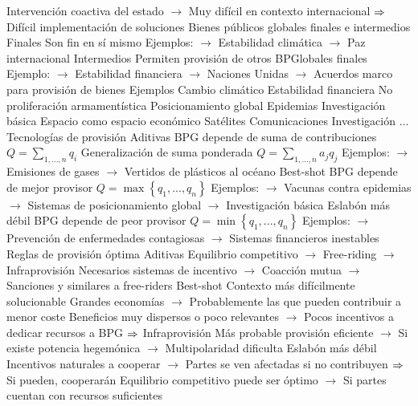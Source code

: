\documentclass{nuevotema}
\begin{document}
\begin{esquemal}
				\4[] Intervención coactiva del estado
				\4[] $\to$ Muy difícil en contexto internacional
				\4[] $\Rightarrow$ Difícil implementación de soluciones
			\3 Bienes públicos globales finales e intermedios
				\4 Finales
				\4[] Son fin en sí mismo
				\4[] Ejemplos:
				\4[] $\to$ Estabilidad climática
				\4[] $\to$ Paz internacional
				\4 Intermedios
				\4[] Permiten provisión de otros BPGlobales finales
				\4[] Ejemplo:
				\4[] $\to$ Estabilidad financiera
				\4[] $\to$ Naciones Unidas
				\4[] $\to$ Acuerdos marco para provisión de bienes
			\3 Ejemplos
				\4 Cambio climático
				\4 Estabilidad financiera
				\4 No proliferación armamentística
				\4 Posicionamiento global
				\4 Epidemias
				\4 Investigación básica
				\4 Espacio como espacio económico
				\4[] Satélites
				\4[] Comunicaciones
				\4[] Investigación
				\4[] ...
			\3 Tecnologías de provisión
				\4 Aditivas
				\4[] BPG depende de suma de contribuciones
				\4[] $Q = \sum_{1,...,n} q_i$
				\4[] Generalización de suma ponderada
				\4[] $Q = \sum_{1,...,n} a_j q_j$
				\4[] Ejemplos:
				\4[] $\to$ Emisiones de gases
				\4[] $\to$ Vertidos de plásticos al océano
				\4 Best-shot
				\4[] BPG depende de mejor provisor
				\4[] $Q = \max \left\lbrace q_1, ..., q_n \right\rbrace$
				\4[] Ejemplos:
				\4[] $\to$ Vacunas contra epidemias
				\4[] $\to$ Sistemas de posicionamiento global
				\4[] $\to$ Investigación básica
				\4 Eslabón más débil
				\4[] BPG depende de peor provisor
				\4[] $Q = \min \left\lbrace q_1, ..., q_n \right\rbrace$
				\4[] Ejemplos:
				\4[] $\to$ Prevención de enfermedades contagiosas
				\4[] $\to$ Sistemas financieros inestables
			\3 Reglas de provisión óptima
				\4 Aditivas
				\4[] Equilibrio competitivo
				\4[] $\to$ Free-riding
				\4[] $\to$ Infraprovisión
				\4[] Necesarios sistemas de incentivo
				\4[] $\to$ Coacción mutua
				\4[] $\to$ Sanciones y similares a free-riders
				\4 Best-shot
				\4[] Contexto más difícilmente solucionable
				\4[] Grandes economías
				\4[] $\to$ Probablemente las que pueden contribuir a menor coste
				\4[] Beneficios muy dispersos o poco relevantes
				\4[] $\to$ Pocos incentivos a dedicar recursos a BPG
				\4[] $\Rightarrow$ Infraprovisión
				\4[] Más probable provisión eficiente
				\4[] $\to$ Si existe potencia hegemónica
				\4[] $\to$ Multipolaridad dificulta
				\4 Eslabón más débil
				\4[] Incentivos naturales a cooperar
				\4[] $\to$ Partes se ven afectadas si no contribuyen
				\4[] $\Rightarrow$ Si pueden, cooperarán
				\4[] Equilibrio competitivo puede ser óptimo
				\4[] $\to$ Si partes cuentan con recursos suficientes

\end{esquemal}
\end{document}

